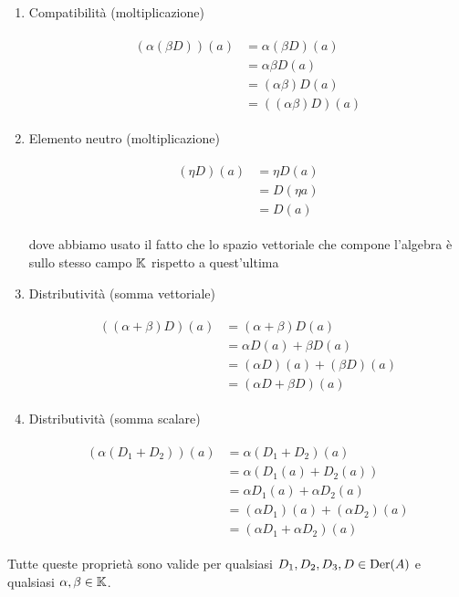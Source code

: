 {\begin{enumerate}
	\item Compatibilità (moltiplicazione)
	
	\begin{align}
		\begin{split}
			(\alpha (\beta D)) (a) &= \alpha (\beta D) (a) \\
			&= \alpha \beta D (a) \\
			&= (\alpha \beta) D (a) \\
			&= ((\alpha \beta) D) (a)
		\end{split}
	\end{align}
	
	\item Elemento neutro (moltiplicazione)
	
	\begin{align}
		\begin{split}
			(\eta D) (a) &= \eta D (a) \\
			&= D (\eta a) \\
			&= D (a)
		\end{split}
	\end{align}
	
	dove abbiamo usato il fatto che lo spazio vettoriale che compone l'algebra è sullo stesso campo $ \mathbb{K} $ rispetto a quest'ultima
	
	\item Distributività (somma vettoriale)
	
	\begin{align}
		\begin{split}
			((\alpha + \beta) D) (a) &= (\alpha + \beta) D (a) \\
			&= \alpha D (a) + \beta D (a) \\
			&= (\alpha D) (a) + (\beta D) (a) \\
			&= (\alpha D + \beta D) (a)
		\end{split}
	\end{align}
	
	\item Distributività (somma scalare)
	
	\begin{align}
		\begin{split}
			(\alpha (D_{1} + D_{2})) (a) &= \alpha (D_{1} + D_{2}) (a) \\
			&= \alpha (D_{1} (a) + D_{2} (a)) \\
			&= \alpha D_{1} (a) + \alpha D_{2} (a) \\
			&= (\alpha D_{1}) (a) + (\alpha D_{2}) (a) \\
			&= (\alpha D_{1} + \alpha D_{2}) (a)
		\end{split}
	\end{align}
\end{enumerate}

Tutte queste proprietà sono valide per qualsiasi $ D_{1}, D_{2}, D_{3}, D \in \operatorname{Der}(A) $ e qualsiasi $ \alpha, \beta \in \mathbb{K} $.
}


